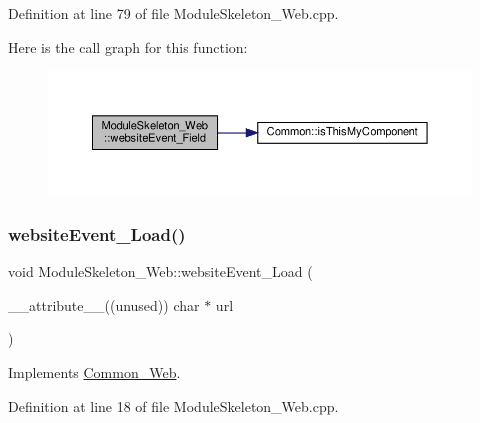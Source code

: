 Definition at line 79 of file Module\+Skeleton\+\_\+\+Web.\+cpp.

Here is the call graph for this function\+:
\nopagebreak
\begin{figure}[H]
\begin{center}
\leavevmode
\includegraphics[width=350pt]{class_module_skeleton___web_aeff57d699bdcbab91538f8073cdbf9b0_cgraph}
\end{center}
\end{figure}
\mbox{\label{class_module_skeleton___web_a391e4cad5fa897f0b57e3992c68eac14}} 
\subsubsection{\texorpdfstring{website\+Event\+\_\+\+Load()}{websiteEvent\_Load()}}
{\footnotesize\ttfamily void Module\+Skeleton\+\_\+\+Web\+::website\+Event\+\_\+\+Load (\begin{DoxyParamCaption}\item[{\+\_\+\+\_\+attribute\+\_\+\+\_\+((unused)) char $\ast$}]{url }\end{DoxyParamCaption})\hspace{0.3cm}{\ttfamily [virtual]}}



Implements \hyperlink{class_common___web_a5ce0d5ce6f63279c3b624371d8a76211}{Common\+\_\+\+Web}.



Definition at line 18 of file Module\+Skeleton\+\_\+\+Web.\+cpp.

